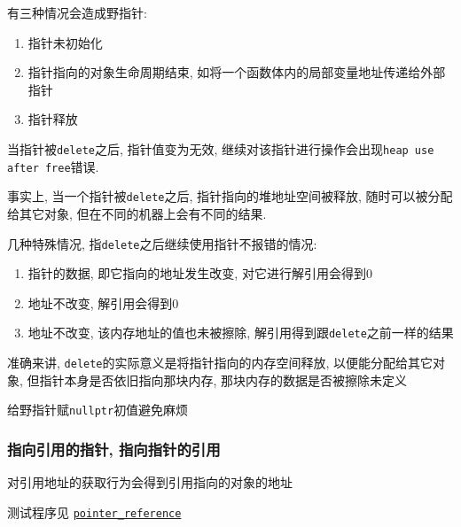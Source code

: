 有三种情况会造成野指针:
\begin{enumerate}
	\item 指针未初始化
	\item 指针指向的对象生命周期结束, 如将一个函数体内的局部变量地址传递给外部指针
	\item 指针释放
\end{enumerate}

当指针被{\tt delete}之后, 指针值变为无效, 继续对该指针进行操作会出现{\tt heap use after free}错误.

事实上, 当一个指针被{\tt delete}之后, 指针指向的堆地址空间被释放, 随时可以被分配给其它对象, 但在不同的机器上会有不同的结果.

\noindent 几种特殊情况, 指{\tt delete}之后继续使用指针不报错的情况:
\begin{enumerate}
	\item 指针的数据, 即它指向的地址发生改变, 对它进行解引用会得到0
	\item 地址不改变, 解引用会得到0
	\item 地址不改变, 该内存地址的值也未被擦除, 解引用得到跟{\tt delete}之前一样的结果
\end{enumerate}

准确来讲, {\tt delete}的实际意义是将指针指向的内存空间释放, 以便能分配给其它对象, 但指针本身是否依旧指向那块内存, 
	那块内存的数据是否被擦除未定义

给野指针赋{\tt nullptr}初值避免麻烦

\subsubsection{指向引用的指针, 指向指针的引用}
对引用地址的获取行为会得到引用指向的对象的地址

测试程序见 \href{https://github.com/wenqingqian/Obtuse/blob/main/test/cpp/basic/pointer_reference.cpp}{\tt pointer\_reference}




